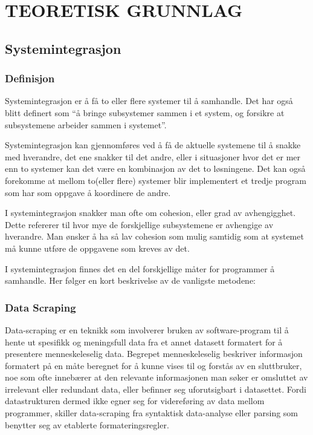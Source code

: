 \documentclass[../main.tex]{subfiles}
\begin{document}
\section{TEORETISK GRUNNLAG}

\subsection{Systemintegrasjon}

\subsubsection{Definisjon}
Systemintegrasjon er å få to eller flere systemer til å samhandle. Det har også blitt definert som “å bringe subsystemer sammen i et system, og forsikre at subsystemene arbeider sammen i systemet”. 

Systemintegrasjon kan gjennomføres ved å få de aktuelle systemene til å snakke med hverandre, det ene snakker til det andre, eller i situasjoner hvor det er mer enn to systemer kan det være en kombinasjon av det to løsningene. Det kan også forekomme at mellom to(eller flere) systemer blir implementert et tredje program som har som oppgave å koordinere de andre.

I systemintegrasjon snakker man ofte om cohesion, eller grad av avhengigghet. Dette refererer til hvor mye de forskjellige subsystemene er avhengige av hverandre. Man ønsker å ha så lav cohesion som mulig samtidig som at systemet må kunne utføre de oppgavene som kreves av det.

I systemintegrasjon finnes det en del forskjellige måter for programmer å samhandle. Her følger en kort beskrivelse av de vanligste metodene:

\subsubsection{Data Scraping}
Data-scraping er en teknikk som involverer bruken av software-program til å hente ut spesifikk og meningsfull data fra et annet datasett formatert for å presentere menneskeleselig data. Begrepet menneskeleselig beskriver informasjon formatert på en måte beregnet for å kunne vises til og forstås av en sluttbruker, noe som ofte innebærer at den relevante informasjonen man søker er omsluttet av irrelevant eller redundant data, eller befinner seg uforutsigbart i datasettet. Fordi datastrukturen dermed ikke egner seg for videreføring av data mellom programmer, skiller data-scraping fra syntaktisk data-analyse eller parsing som benytter seg av etablerte formateringsregler. 
\end{document}

